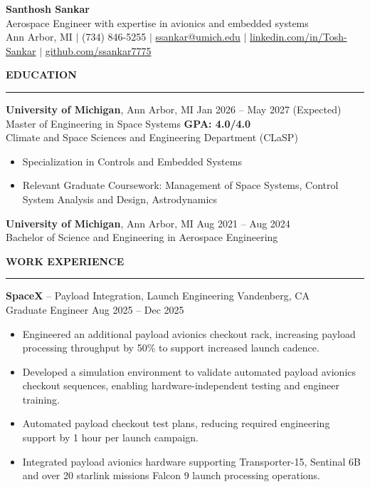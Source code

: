 \documentclass[10pt]{article}
\newcommand{\ressection}[1]{
  \vspace{0.12em}
  {\large\bfseries #1}\par
  \vspace{0.05em}\hrule\vspace{0.12em}
}
\begin{document}
\begin{center}
{\LARGE {\bfseries Santhosh Sankar}} \\
{\small Aerospace Engineer with expertise in avionics and embedded systems} \\
Ann Arbor, MI \enspace $\vert$ \enspace (734) 846-5255 \enspace $\vert$ \enspace
\href{mailto:ssankar@umich.edu}{ssankar@umich.edu} \enspace $\vert$ \enspace
\href{https://www.linkedin.com/in/santhosh-sankar-3241521b8/}{linkedin.com/in/Tosh-Sankar} \enspace $\vert$ \enspace
\href{https://github.com/ssankar7775}{github.com/ssankar7775}
\end{center}

\ressection{EDUCATION}

{\bfseries University of Michigan}, Ann Arbor, MI \hfill Jan 2026 -- May 2027 (Expected) \\
Master of Engineering in Space Systems \hfill {\bfseries GPA: 4.0/4.0} \\
Climate and Space Sciences and Engineering Department (CLaSP)

\begin{itemize}
  \item Specialization in Controls and Embedded Systems
  \item Relevant Graduate Coursework: Management of Space Systems, Control System Analysis and Design, Astrodynamics
\end{itemize}

{\bfseries University of Michigan}, Ann Arbor, MI \hfill Aug 2021 -- Aug 2024 \\
Bachelor of Science and Engineering in Aerospace Engineering

\ressection{WORK EXPERIENCE}

{\bfseries SpaceX} -- Payload Integration, Launch Engineering \hfill Vandenberg, CA \\
Graduate Engineer \hfill Aug 2025 -- Dec 2025
\begin{itemize}
\item Engineered an additional payload avionics checkout rack, increasing payload processing throughput by 50\% to support increased launch cadence.
\item Developed a simulation environment to validate automated payload avionics checkout sequences, enabling hardware-independent testing and engineer training.
\item Automated payload checkout test plans, reducing required engineering support by 1 hour per launch campaign.
\item Integrated payload avionics hardware supporting Transporter-15, Sentinal 6B and over 20 starlink missions Falcon 9 launch processing operations.
\end{itemize}
\end{document}
